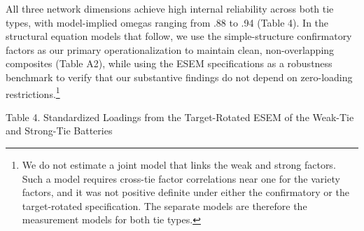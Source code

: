 \documentclass[
  12pt
]{article}
\begin{document}
All three network dimensions achieve high internal reliability across both tie types, with model-implied omegas ranging from .88 to .94 (Table 4). In the structural equation models that follow, we use the simple-structure confirmatory factors as our primary operationalization to maintain clean, non-overlapping composites (Table A2), while using the ESEM specifications as a robustness benchmark to verify that our substantive findings do not depend on zero-loading restrictions.\footnote{We do not estimate a joint model that links the weak and strong factors. Such a model requires cross-tie factor correlations near one for the variety factors, and it was not positive definite under either the confirmatory or the target-rotated specification. The separate models are therefore the measurement models for both tie types.}

Table 4. Standardized Loadings from the Target-Rotated ESEM of the Weak-Tie and Strong-Tie Batteries
\end{document}
